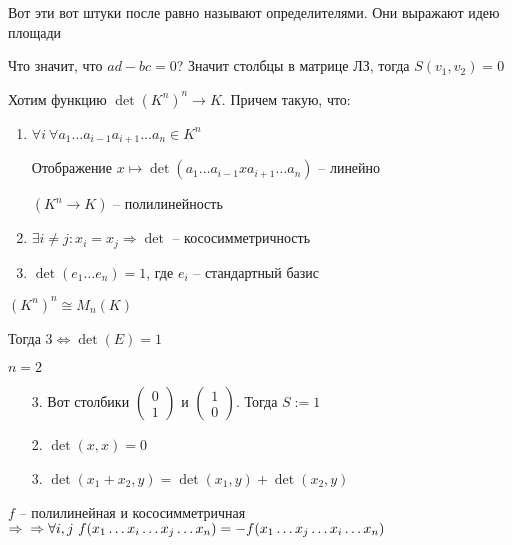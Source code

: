 \documentclass[12pt]{article}
\begin{document}
Вот эти вот штуки после равно называют определителями. Они выражают идею площади

Что значит, что $ad - bc = 0$? Значит столбцы в матрице ЛЗ, тогда $S(v_1, v_2) = 0$

Хотим функцию $\det (K^n)^n \to K$. Причем такую, что:

\begin{enumerate}
    \item $\forall i\ \forall a_1 \ldots a_{i - 1} a_{i + 1} \ldots a_n \in K^n$
    
    Отображение $x \mapsto \det (a_1 \ldots a_{i - 1} x a_{i + 1} \ldots a_n)$ -- линейно

    $(K^n \to K)$ -- полилинейность

    \item $\exists i \neq j : x_i = x_j \Rightarrow \det $ -- кососимметричность
    \item $\det (e_1 \ldots e_n) = 1$, где $e_i$ -- стандартный базис
\end{enumerate}

\begin{Remark}{}
    $(K^n)^n \cong M_n(K)$
    
    Тогда $3 \Leftrightarrow \det (E) = 1$
\end{Remark}

\begin{Example}{}
    $n = 2$

    \begin{enumerate}
        \item[3.] Вот столбики $\begin{pmatrix}
                0 \\
                1
            \end{pmatrix}$ и $\begin{pmatrix}
                1 \\
                0
            \end{pmatrix}$. Тогда $S := 1$

        \item[2.] $\det (x, x) = 0$
        \item[3.] $\det (x_1 + x_2, y) = \det (x_1, y) + \det (x_2, y)$
    \end{enumerate}
\end{Example}

\begin{Remark}{}
    $f$ -- полилинейная и кососимметричная $\Rightarrow \\
    \Rightarrow \forall i, j\ f(x_1 \ldots x_i \ldots x_j \ldots x_n) = -f(x_1 \ldots x_j \ldots x_i \ldots x_n)$
\end{Remark}
\end{document}
